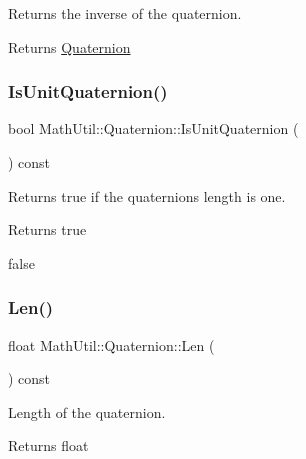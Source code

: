 Returns the inverse of the quaternion. 

\begin{DoxyReturn}{Returns}
\hyperlink{structMathUtil_1_1Quaternion}{Quaternion} 
\end{DoxyReturn}
\mbox{\label{structMathUtil_1_1Quaternion_a78501552147c626d5096ef1039a1c254}} 
\subsubsection{\texorpdfstring{Is\+Unit\+Quaternion()}{IsUnitQuaternion()}}
{\footnotesize\ttfamily bool Math\+Util\+::\+Quaternion\+::\+Is\+Unit\+Quaternion (\begin{DoxyParamCaption}{ }\end{DoxyParamCaption}) const\hspace{0.3cm}{\ttfamily [inline]}}



Returns true if the quaternions length is one. 

\begin{DoxyReturn}{Returns}
true 

false 
\end{DoxyReturn}
\mbox{\label{structMathUtil_1_1Quaternion_a96a16f91e1c46f84f21134e4b46f733d}} 
\subsubsection{\texorpdfstring{Len()}{Len()}}
{\footnotesize\ttfamily float Math\+Util\+::\+Quaternion\+::\+Len (\begin{DoxyParamCaption}{ }\end{DoxyParamCaption}) const\hspace{0.3cm}{\ttfamily [inline]}}



Length of the quaternion. 

\begin{DoxyReturn}{Returns}
float 
\end{DoxyReturn}
\mbox{\label{structMathUtil_1_1Quaternion_a305895ae4783d67d6972fe51b930eaea}} 
